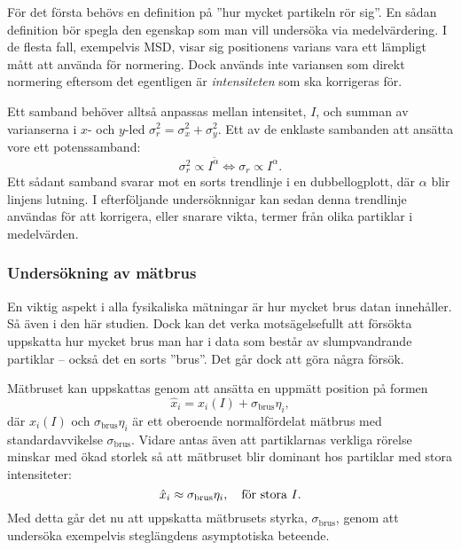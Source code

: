 För det första behövs en definition på ''hur mycket partikeln rör sig''. En sådan definition bör spegla den egenskap som man vill undersöka via medelvärdering. I de flesta fall, exempelvis MSD, visar sig positionens varians vara ett lämpligt mått att använda för normering. Dock används inte variansen som direkt normering eftersom det egentligen är \emph{intensiteten} som ska korrigeras för.

Ett samband behöver alltså anpassas mellan intensitet, $I$, och summan av varianserna i $x$- och $y$-led $\sigma_r^2=\sigma_x^2+\sigma_y^2$. Ett av de enklaste sambanden att ansätta vore ett potenssamband:
\begin{equation}
\sigma_r^2 \propto I^{\tilde\alpha} 
\Longleftrightarrow 
\sigma_r \propto I^\alpha.
\end{equation}
Ett sådant samband svarar mot en sorts trendlinje i en dubbellogplott, där $\alpha$ blir linjens lutning. I efterföljande undersöknnigar kan sedan denna trendlinje användas för att korrigera, eller snarare vikta, termer från olika partiklar i medelvärden.

\subsubsection{Undersökning av mätbrus}
En viktig aspekt i alla fysikaliska mätningar är hur mycket brus datan innehåller. Så även i den här studien. Dock kan det verka motsägelsefullt att försökta uppskatta hur mycket brus man har i data som består av slumpvandrande partiklar -- också det en sorts ''brus''. Det går dock att göra några försök. 

Mätbruset kan uppskattas genom att ansätta en uppmätt position på formen
\begin{equation}
\hat{x}_i = x_i(I) + \sigma_\text{brus}\eta_i,
\end{equation}
där $x_i(I)$ och $\sigma_\text{brus}\eta_i$ är ett oberoende normalfördelat mätbrus med standardavvikelse $\sigma_\text{brus}$. Vidare antas även att partiklarnas verkliga rörelse minskar med ökad storlek så att mätbruset blir dominant hos partiklar med stora intensiteter:
\begin{equation}\label{eq:approx_noise}
\hat{x}_i \approx \sigma_\text{brus}\eta_i \qcomma \text{för stora } I.
\end{equation}
Med detta går det nu att uppskatta mätbrusets styrka, $\sigma_\text{brus}$, genom att undersöka exempelvis steglängdens asymptotiska beteende. 

